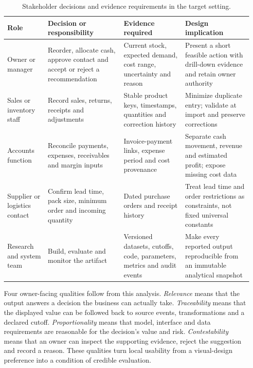 \begin{table}[H]
\centering
\small
\caption{Stakeholder decisions and evidence requirements in the target setting.}
\label{tab:stakeholder_requirements}
\begin{tabularx}{\textwidth}{|p{}|p{}|Y|Y|}
\hline
\textbf{Role} & \textbf{Decision or responsibility} & \textbf{Evidence required} & \textbf{Design implication} \\
\hline
Owner or manager & Reorder, allocate cash, approve contact and accept or reject a recommendation & Current stock, expected demand, cost range, uncertainty and reason & Present a short feasible action with drill-down evidence and retain owner authority \\
Sales or inventory staff & Record sales, returns, receipts and adjustments & Stable product keys, timestamps, quantities and correction history & Minimize duplicate entry; validate at import and preserve corrections \\
Accounts function & Reconcile payments, expenses, receivables and margin inputs & Invoice-payment links, expense period and cost provenance & Separate cash movement, revenue and estimated profit; expose missing cost data \\
Supplier or logistics contact & Confirm lead time, pack size, minimum order and incoming quantity & Dated purchase orders and receipt history & Treat lead time and order restrictions as constraints, not fixed universal constants \\
Research and system team & Build, evaluate and monitor the artifact & Versioned datasets, cutoffs, code, parameters, metrics and audit events & Make every reported output reproducible from an immutable analytical snapshot \\
\hline
\end{tabularx}
\end{table}

Four owner-facing qualities follow from this analysis. \emph{Relevance} means
that the output answers a decision the business can actually take.
\emph{Traceability} means that the displayed value can be followed back to
source events, transformations and a declared cutoff. \emph{Proportionality}
means that model, interface and data requirements are reasonable for the
decision's value and risk. \emph{Contestability} means that an owner can inspect
the supporting evidence, reject the suggestion and record a reason. These
qualities turn local usability from a visual-design preference into a condition
of credible evaluation.

